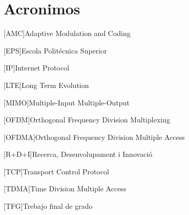 \chapter{Acronimos} %
%
%
\begin{acronym}

[AMC]{Adaptive Modulation and Coding}

[EPS]{Escola Politécnica Superior}

[IP]{Internet Protocol}

[LTE]{Long Term Evolution}

[MIMO]{Multiple-Input Multiple-Output}

[OFDM]{Orthogonal Frequency Division Multiplexing}

[OFDMA]{Orthogonal Frequency Division Multiple Access}

[R+D+I]{Recerca, Desenvolupament i Innovació}

[TCP]{Transport Control Protocol}

[TDMA]{Time Division Multiple Access}

[TFG]{Trebajo final de grado}


\end{acronym}
